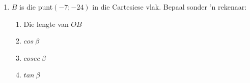 \begin{exercises}{}
{
  \begin{enumerate}[itemsep=5pt, label=\textbf{\arabic*}. ]
   \item $B$ is die punt$(-7;-24)$ in die Cartesiese vlak. Bepaal sonder 'n rekenaar:
\begin{enumerate}[noitemsep, label=\textbf{(\alph*)} ]
 \item Die lengte van $OB$
\item $cos~\beta$
\item $cosec~\beta$
\item $tan~\beta$
\end{enumerate}



\end{enumerate}}
\end{exercises}
